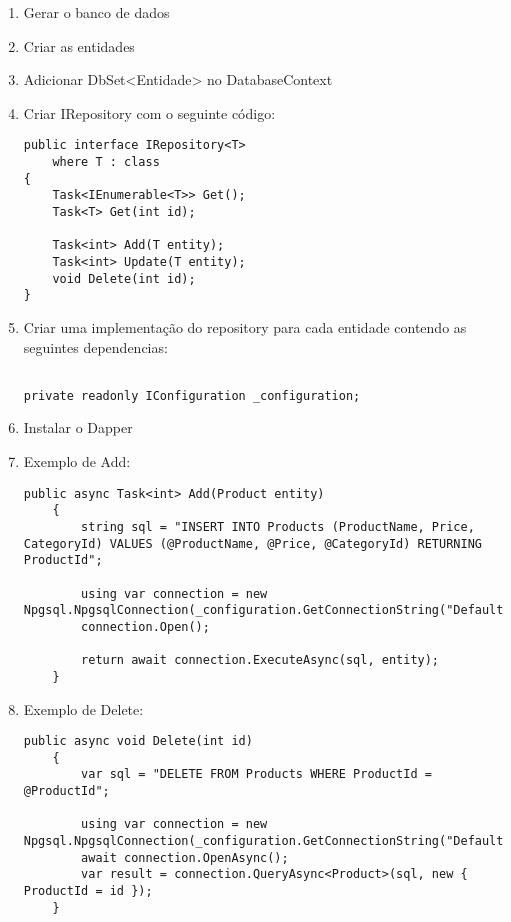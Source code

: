 \documentclass{article}
\begin{document}
\begin{enumerate}

    \item Gerar o banco de dados
    
    \item Criar as entidades

    \item Adicionar DbSet<Entidade> no DatabaseContext
    
    \item Criar IRepository com o seguinte código:
    
    \begin{verbatim}
public interface IRepository<T>
    where T : class
{
    Task<IEnumerable<T>> Get();
    Task<T> Get(int id);

    Task<int> Add(T entity);
    Task<int> Update(T entity);
    void Delete(int id);
}
    \end{verbatim}
    
    \item Criar uma implementação do repository para cada entidade contendo as seguintes dependencias:
    
    \begin{verbatim}

private readonly IConfiguration _configuration;
    \end{verbatim}
    
    \item Instalar o Dapper
    
    \item Exemplo de Add:
    \begin{verbatim}
public async Task<int> Add(Product entity)
    {
        string sql = "INSERT INTO Products (ProductName, Price, CategoryId) VALUES (@ProductName, @Price, @CategoryId) RETURNING ProductId";

        using var connection = new Npgsql.NpgsqlConnection(_configuration.GetConnectionString("DefaultConnection"));
        connection.Open();

        return await connection.ExecuteAsync(sql, entity);
    }
    \end{verbatim}
    
    \item Exemplo de Delete:
    \begin{verbatim}
public async void Delete(int id)
    {
        var sql = "DELETE FROM Products WHERE ProductId = @ProductId";

        using var connection = new Npgsql.NpgsqlConnection(_configuration.GetConnectionString("DefaultConnection"));
        await connection.OpenAsync();
        var result = connection.QueryAsync<Product>(sql, new { ProductId = id });
    }
    \end{verbatim}
    

\end{enumerate}
\end{document}
